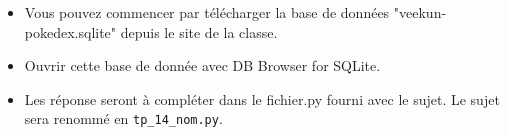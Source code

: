 \begin{itemize}
\item Vous pouvez commencer par télécharger la base de données "veekun-pokedex.sqlite" depuis le site de la classe.
\item Ouvrir cette base de donnée avec DB Browser for SQLite.
\item Les réponse seront à compléter dans le fichier.py fourni avec le sujet. Le sujet sera renommé en \texttt{tp\_14\_nom.py}.
\end{itemize}


